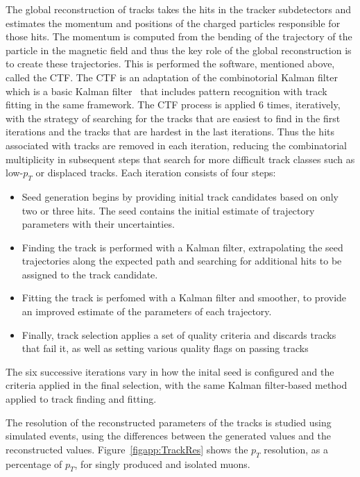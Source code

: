 The global reconstruction of tracks takes the hits in the tracker subdetectors and estimates the momentum and positions of the charged particles responsible for those hits.  The momentum is computed from the bending of the trajectory of the particle in the magnetic field and thus the key role of the global reconstruction is to create these trajectories.  This is performed the software, mentioned above, called the CTF.  The CTF is an adaptation of the combinotorial Kalman filter~\cite{Kalman_Comb1,Kalman_Comb2,Kalman_Comb3} which is a basic Kalman filter~\cite{Kalman_Plain} that includes pattern recognition with track fitting in the same framework.   The CTF process is applied 6 times, iteratively, with the strategy of searching for the tracks that are easiest to find in the first iterations and the tracks that are hardest in the last iterations.  Thus the hits associated with tracks are removed in each iteration, reducing the combinatorial multiplicity in subsequent steps that search for more difficult track classes such as low-$p_T$ or displaced tracks.  Each iteration consists of four steps:

\begin{itemize}
\item{Seed generation begins by providing initial track candidates based on only two or three hits.  The seed contains the initial estimate of trajectory parameters with their uncertainties.}
\item{Finding the track is performed with a Kalman filter, extrapolating the seed trajectories along the expected path and searching for additional hits to be assigned to the track candidate.}
\item{Fitting the track is perfomed with a Kalman filter and smoother, to provide an improved estimate of the parameters of each trajectory.}
\item{Finally, track selection applies a set of quality criteria and discards tracks that fail it, as well as setting various quality flags on passing tracks}
\end{itemize}

The six successive iterations vary in how the inital seed is configured and the criteria applied in the final selection, with the same Kalman filter-based method applied to track finding and fitting.

The resolution of the reconstructed parameters of the tracks is studied using simulated events, using the differences between the generated values and the reconstructed values.  Figure~\ref{figapp:TrackRes} shows the $p_T$ resolution, as a percentage of $p_T$, for singly produced and isolated muons.



